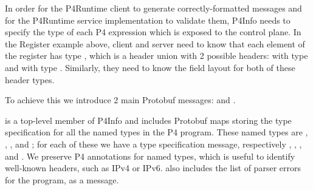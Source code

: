 \documentclass[11pt]{article}
\begin{document}
{%
\noindent{}In order for the P4Runtime client to generate correctly-formatted messages and
for the P4Runtime service implementation to validate them, P4Info needs to
specify the type of each P4 expression which is exposed to the control plane. In
the Register example above, client and server need to know that each element of
the register has type , which is a header union with 2 possible headers:
 with type  and  with type . Similarly, they need to
know the field layout for both of these header types.%

To achieve this we introduce 2 main Protobuf messages:  and
.%

 is a top-level member of P4Info and includes Protobuf maps storing
the type specification for all the named types in the P4 program. These
named types are , , ,  and
; for each of these we have a type specification message,
respectively , , ,
 and . We preserve P4 annotations
for named types, which is useful to identify well-known headers, such as IPv4 or
IPv6.   also includes the list of parser errors for the program, as
a  message.%

}
\end{document}
